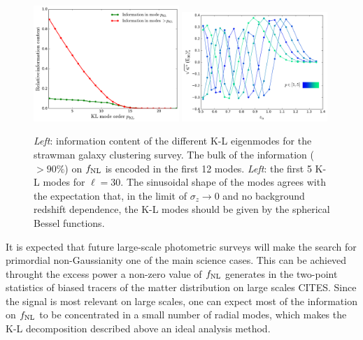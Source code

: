 \documentclass[twocolumn,amsfont,amssymb,amsmath, showpacs,balancelastpage, nofootinbib]{revtex4-1}
\begin{document}
    \begin{figure}
      \centering
      \includegraphics[width=0.49\textwidth]{Figs/information_gc}
      \includegraphics[width=0.49\textwidth]{Figs/kl_modes_gc}
      \caption{{\sl Left}: information content of the different K-L eigenmodes for the strawman galaxy clustering survey. The bulk of the information ($>90\%$) on $f_{\rm NL}$ is encoded in the first 12 modes. {\sl Left}: the first 5 K-L modes for $\ell=30$. The sinusoidal shape of the modes agrees with the expectation that, in the limit of $\sigma_z\rightarrow0$ and no background redshift dependence, the K-L modes should be given by the spherical Bessel functions. }\label{fig:kl_gc}
    \end{figure}
    It is expected that future large-scale photometric surveys will make the search for primordial non-Gaussianity one of the main science cases. This can be achieved throught the excess power a non-zero value of $f_{\rm NL}$ generates in the two-point statistics of biased tracers of the matter distribution on large scales CITES. Since the signal is most relevant on large scales, one can expect most of the information on $f_{\rm NL}$ to be concentrated in a small number of radial modes, which makes the K-L decomposition described above an ideal analysis method.
    
\end{document}
